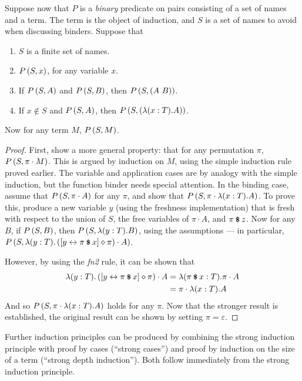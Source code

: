 \begin{lemma}
\label{lemma:strong-induction}
Suppose now that \(P\) is a \emph{binary} predicate on pairs consisting of a set of names and a term.
The term is the object of induction, and \(S\) is a set of names to avoid when discussing binders.
Suppose that
\begin{enumerate}
\item
\(S\) is a finite set of names.
\item
\(P\left(S, x\right)\), for any variable \(x\).
\item
If \(P\left(S, A\right)\) and \(P\left(S, B\right)\), then \(P\left(S, \left(A\ B\right)\right)\).
\item
If \(x \notin S\) and \(P\left(S, A\right)\), then \(P\left(S, \left(\lambda (x:T). A\right)\right)\).
\end{enumerate}
Now for any term \(M\), \(P\left(S, M\right)\).
\end{lemma}
\begin{proof}
First, show a more general property: that for any permutation \(\pi\), \(P\left(S, \pi \cdot M\right)\).
This is argued by induction on \(M\), using the simple induction rule proved earlier.
The variable and application cases are by analogy with the simple induction, but the function binder needs special attention.
In the binding case, assume that \(P\left(S, \pi \cdot A\right)\) for any \(\pi\), and show that \(P\left(S, \pi \cdot \lambda (x:T).A\right)\).
To prove this, produce a new variable \(y\) (using the freshness implementation) that is fresh with respect to the union of \(S\), the free variables of \(\pi \cdot A\), and \(\pi \mathbin{\textrm{\footnotesize{\textbf{\$}}}} z\).
Now for any \(B\), if \(P\left(S, B\right)\), then \(P\left(S, \lambda (y:T).B\right)\), using the assumptions --- in particular, \(P\left(S, \lambda (y:T). \left([y \leftrightarrow \pi \mathbin{\textrm{\footnotesize{\textbf{\$}}}} x] \diamond \pi\right) \cdot A\right)\).

However, by using the \emph{fn2} rule, it can be shown that
\begin{align*}
\lambda (y:T). \left([y \leftrightarrow \pi \mathbin{\textrm{\footnotesize{\textbf{\$}}}} x] \diamond \pi\right) \cdot A
&= \lambda (\pi \mathbin{\textrm{\footnotesize{\textbf{\$}}}} x:T). \pi \cdot A\\
&= \pi \cdot \lambda (x:T). A
\end{align*}
And so \(P\left(S, \pi \cdot \lambda (x:T).A\right)\) holds for any \(\pi\).
Now that the stronger result is established, the original result can be shown by setting \(\pi = \varepsilon\).
\end{proof}

Further induction principles can be produced by combining the strong induction principle with proof by cases (``strong cases'') and proof by induction on the size of a term (``strong depth induction'').
Both follow immediately from the strong induction principle.

